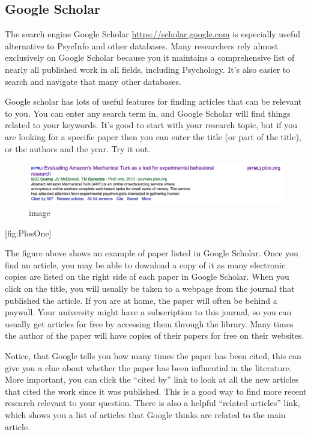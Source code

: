 \documentclass[]{book}
\theoremstyle{definition}
\theoremstyle{definition}
\theoremstyle{remark}
\begin{document}
\subsection{Google Scholar}\label{google-scholar}

The search engine Google Scholar \url{https://scholar.google.com} is
especially useful alternative to PsycInfo and other databases. Many
researchers rely almost exclusively on Google Scholar because you it
maintains a comprehensive list of nearly all published work in all
fields, including Psychology. It's also easier to search and navigate
that many other databases.

Google scholar has lots of useful features for finding articles that can
be relevant to you. You can enter any search term in, and Google Scholar
will find things related to your keywords. It's good to start with your
research topic, but if you are looking for a specific paper then you can
enter the title (or part of the title), or the authors and the year. Try
it out.

\begin{figure}[htbp]
\centering
\includegraphics{figures/CrumpPlosOne.png}
\caption{image}
\end{figure}

{[}fig:PlosOne{]}

The figure above shows an example of paper listed in Google Scholar.
Once you find an article, you may be able to download a copy of it as
many electronic copies are listed on the right side of each paper in
Google Scholar. When you click on the title, you will usually be taken
to a webpage from the journal that published the article. If you are at
home, the paper will often be behind a paywall. Your university might
have a subscription to this journal, so you can usually get articles for
free by accessing them through the library. Many times the author of the
paper will have copies of their papers for free on their websites.

Notice, that Google tells you how many times the paper has been cited,
this can give you a clue about whether the paper has been influential in
the literature. More important, you can click the ``cited by'' link to
look at all the new articles that cited the work since it was published.
This is a good way to find more recent research relevant to your
question. There is also a helpful ``related articles'' link, which shows
you a list of articles that Google thinks are related to the main
article.
\end{document}
